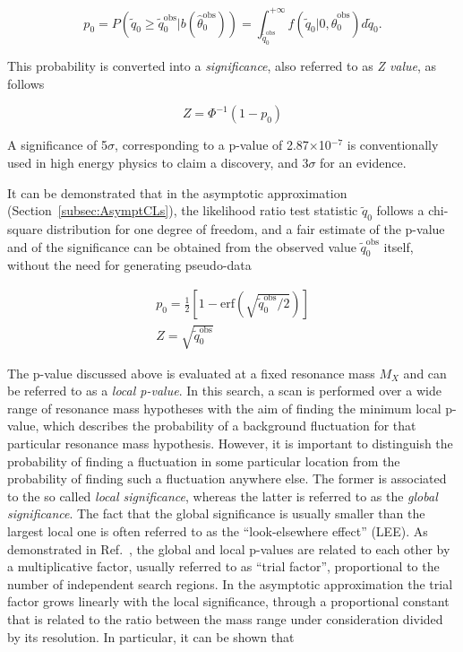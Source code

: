 \begin{equation}
p_0 = P(\tilde{q}_0 \geq \tilde{q}_0^\mathrm{obs}|b(\hat{\theta}_0^\mathrm{obs})) = \int_{\tilde{q}_0^\mathrm{obs}}^{+\infty} f(\tilde{q}_0|0,\hat{\theta}_0^\mathrm{obs})d\tilde{q}_0.
\end{equation}

This probability is converted into a {\itshape significance}, also referred to as {\itshape Z value}, as follows

\begin{equation}
Z = \Phi^{-1} (1-p_0)
\end{equation}

A significance of 5$\sigma$, corresponding to a p-value of 2.87$\times$10$^{-7}$ is conventionally used in high energy physics to claim a discovery,
and 3$\sigma$ for an evidence.

It can be demonstrated that in the asymptotic approximation (Section~\ref{subsec:AsymptCLs}), the likelihood ratio test statistic $\tilde{q}_0$
follows a chi-square distribution for one degree of freedom, and a fair estimate of the p-value and of the significance can be obtained from the observed value $\tilde{q}_0^\mathrm{obs}$ itself,
without the need for generating pseudo-data

\begin{equation}
\begin{gathered}
p_0 = \frac{1}{2} [ 1 - \mathrm{erf}(\sqrt{\tilde{q}_0^\mathrm{obs}/2}) ] \\
Z = \sqrt{\tilde{q}_0^\mathrm{obs}}
\end{gathered}
\end{equation}

The p-value discussed above is evaluated at a fixed resonance mass $M_X$ and can be referred to as a {\itshape local p-value}.
In this search, a scan is performed over a wide range of resonance mass hypotheses with the aim of finding
the minimum local p-value, which describes the probability of a background fluctuation for that particular resonance mass hypothesis.
However, it is important to distinguish the probability of finding a fluctuation in some particular location from the probability of finding such a fluctuation anywhere else.
The former is associated to the so called {\itshape local significance}, whereas the latter is referred to as the {\itshape global significance}.
The fact that the global significance is usually smaller than the largest local one is often referred to as the ``look-elsewhere effect'' (LEE).
As demonstrated in Ref.~\cite{Gross:2010qma}, the global and local p-values are related to each other by a multiplicative factor, usually referred to as ``trial factor'', proportional to the number of independent search regions.
In the asymptotic approximation the trial factor grows linearly with the local significance, through a proportional constant
that is related to the ratio between the mass range under consideration divided by its resolution. In particular, it can be shown that

